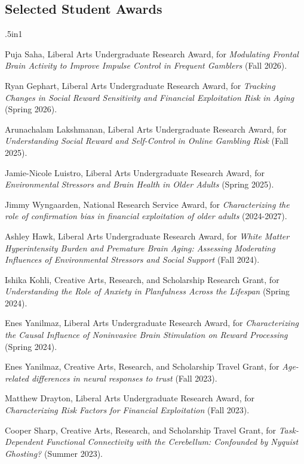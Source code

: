\documentclass[11pt, letterpaper]{article}
\begin{document}
\subsection*{Selected Student Awards}

\begin{hangparas}{.5in}{1}

Puja Saha, Liberal Arts Undergraduate Research Award, for \textit{Modulating Frontal Brain Activity to Improve Impulse Control in Frequent Gamblers} (Fall 2026).

Ryan Gephart, Liberal Arts Undergraduate Research Award, for \textit{Tracking Changes in Social Reward Sensitivity and Financial Exploitation Risk in Aging} (Spring 2026).

Arunachalam Lakshmanan, Liberal Arts Undergraduate Research Award, for \textit{Understanding Social Reward and Self-Control in Online Gambling Risk} (Fall 2025).

Jamie-Nicole Luistro, Liberal Arts Undergraduate Research Award, for \textit{Environmental Stressors and Brain Health in Older Adults} (Spring 2025).

Jimmy Wyngaarden, National Research Service Award, for \textit{Characterizing the role of confirmation bias in financial exploitation of older adults} (2024-2027).

Ashley Hawk, Liberal Arts Undergraduate Research Award, for \textit{White Matter Hyperintensity Burden and Premature Brain Aging: Assessing Moderating Influences of Environmental Stressors and Social Support} (Fall 2024).

Ishika Kohli, Creative Arts, Research, and Scholarship Research Grant, for \textit{Understanding the Role of Anxiety in Planfulness Across the Lifespan} (Spring 2024).

Enes Yanilmaz, Liberal Arts Undergraduate Research Award, for \textit{Characterizing the Causal Influence of Noninvasive Brain Stimulation on Reward Processing} (Spring 2024).

Enes Yanilmaz, Creative Arts, Research, and Scholarship Travel Grant, for \textit{Age-related differences in neural responses to trust} (Fall 2023).

Matthew Drayton, Liberal Arts Undergraduate Research Award, for \textit{Characterizing Risk Factors for Financial Exploitation} (Fall 2023).

Cooper Sharp, Creative Arts, Research, and Scholarship Travel Grant, for \textit{Task-Dependent Functional Connectivity with the Cerebellum: Confounded by Nyquist Ghosting?} (Summer 2023).


\end{hangparas}
\end{document}
